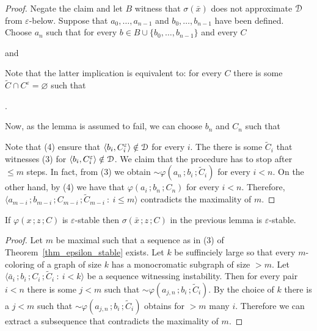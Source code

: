 \begin{proof}
  Negate the claim and let $B$ witness that $\sigma(\bar x)$ does not approximate ${\EuScript D}$ from $\varepsilon$-below.
  Suppose that $a_0,\dots,a_{n-1}$ and $b_0,\dots,b_{n-1}$ have been defined.
  Choose $a_n$ such that for every $b\in B\cup\{b_0,\dots,b_{n-1}\}$ and every $C$

  \quad and

  
  Note that the latter implication is equivalent to: for every $C$ there is some  $\tilde C\cap C^\varepsilon=\varnothing$ such that 
  
  .%

  Now, as the lemma is assumed to fail, we can choose $b_n$ and $C_n$ such that


  Note that (4) ensure that $\langle b_i,C_i^\varepsilon\rangle\notin{\EuScript D}$ for every $i$.
  The there is some $\tilde C_i$ that witnesses (3) for $\langle b_i,C_i^\varepsilon\rangle\notin{\EuScript D}$.
  We claim that the procedure has to stop after $\le m$ steps. 
  In fact, from (3) we obtain ${\sim}\varphi(a_n\,;b_i\,;\tilde C_i)$ for every $i<n$.
  On the other hand, by (4) we have that $\varphi(a_i\,;b_n\,;C_n)$ for every $i<n$.
  Therefore, $\langle a_{m-i}\,;b_{m-i}\,;C_{m-i}\,;\tilde C_{m-i}\ :\ i\le m\rangle$ contradicts the maximality of $m$.
\end{proof}

\begin{lemma}\label{lem_sigma_stable}
  If $\varphi(x\,;z\,;C)$ is $\varepsilon$-stable then $\sigma(\bar x\,;z\,;C)$ in the previous lemma is $\varepsilon$-stable.
\end{lemma}

\begin{proof}
  Let $m$ be maximal such that a sequence as in (3) of Theorem~\ref{thm_epsilon_stable} exists.
  Let $k$ be suffinciely large so that every $m$-coloring of a graph of size $k$ has a monocromatic subgraph of size $>m$.
  Let $\langle \bar a_i\,;b_i\,;C_i\,;\tilde C_i\ :\ i<k\rangle$ be a sequence witnessing instability.
  Then for every pair $i<n$ there is some $j<m$ such that ${\sim}\varphi(a_{j,n}\,;b_i\,;\tilde C_i)$.
  By the choice of $k$ there is a $j<m$ such that ${\sim}\varphi(a_{j,n}\,;b_i\,;\tilde C_i)$ obtains for $>m$ many $i$.
  Therefore we can extract a subsequence that contradicts the maximality of $m$.
\end{proof}
